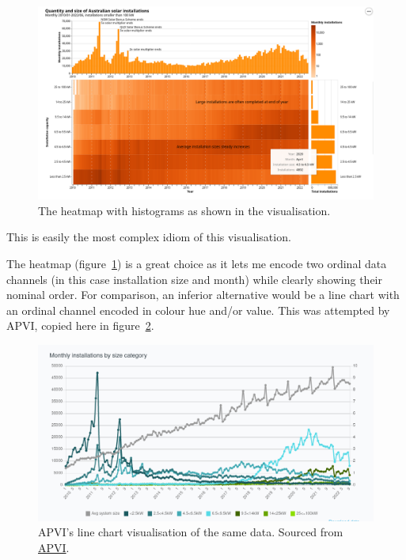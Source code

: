 \documentclass[12pt,letterpaper]{article}
\begin{document}
\begin{multicols}{2}
    \begin{figure}[H]
        \centering
        \includegraphics[width=\linewidth]{images/heatmap.png}
        \caption{The heatmap with histograms as shown in the visualisation.}
        \label{fig:heatmap}
    \end{figure}

    This is easily the most complex idiom of this visualisation.

    The heatmap (figure~\ref{fig:heatmap}) is a great choice as it lets me encode two ordinal data channels (in this case installation size and month) while clearly showing their nominal order. For comparison, an inferior alternative would be a line chart with an ordinal channel encoded in colour hue and/or value. This was attempted by APVI, copied here in figure~\ref{fig:apvi-line}.

    \begin{figure}[H]
        \centering
        \includegraphics[width=\linewidth]{images/apvi-line.png}
        \caption{APVI's line chart visualisation of the same data. Sourced from \href{https://pv-map.apvi.org.au/analyses}{APVI}. \cite{noauthor_australian_2022}}
        \label{fig:apvi-line}
    \end{figure}


\end{multicols}
\end{document}
